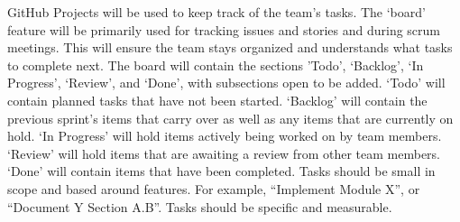 \documentclass{article}
\begin{document}
GitHub Projects will be used to keep track of the team’s tasks. The ‘board’ feature will be primarily used for tracking issues and stories and during scrum meetings. This will ensure the team stays organized and understands what tasks to complete next.
The board will contain the sections ’Todo’, ‘Backlog’, ‘In Progress’, ‘Review’, and ‘Done’, with subsections open to be added. ‘Todo’ will contain planned tasks that have not been started. ‘Backlog’ will contain the previous sprint’s items that carry over as well as any items that are currently on hold. ‘In Progress’ will hold items actively being worked on by team members. ‘Review’ will hold items that are awaiting a review from other team members. ‘Done’ will contain items that have been completed.
Tasks should be small in scope and based around features. For example, “Implement Module X”, or “Document Y Section A.B”. Tasks should be specific and measurable.
\\
\end{document}
